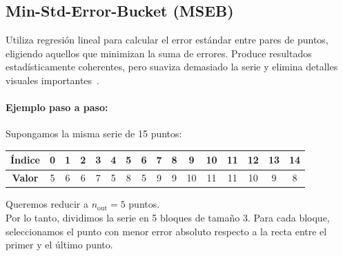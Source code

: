 \subsection{Min-Std-Error-Bucket (MSEB)} 
Utiliza regresión lineal para calcular el error estándar entre pares de puntos, eligiendo aquellos que minimizan la suma de errores. Produce resultados estadísticamente coherentes, pero suaviza demasiado la serie y elimina detalles visuales importantes~\cite{steinarsson2013downsampling}.

\paragraph{Ejemplo paso a paso:}

Supongamos la misma serie de 15 puntos:

\begin{center}
\begin{tabular}{|c|c|c|c|c|c|c|c|c|c|c|c|c|c|c|c|}
\hline
\textbf{Índice} & 0 & 1 & 2 & 3 & 4 & 5 & 6 & 7 & 8 & 9 & 10 & 11 & 12 & 13 & 14 \\
\hline
\textbf{Valor} & 5 & 6 & 6 & 7 & 5 & 8 & 5 & 9 & 9 & 10 & 11 & 11 & 10 & 9 & 8 \\
\hline
\end{tabular}
\end{center}

Queremos reducir a $n_{\text{out}} = 5$ puntos. \\Por lo tanto, dividimos la serie en 5 bloques de tamaño 3. Para cada bloque, seleccionamos el punto con menor error absoluto respecto a la recta entre el primer y el último punto.

